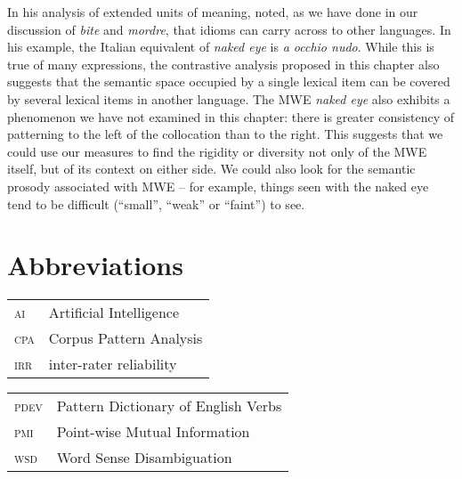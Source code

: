 \documentclass[output=paper]{langsci/langscibook}
\begin{document}
\largerpage
In his analysis of extended units of meaning, \cite{Sinclair:1991}  noted, as
we have done in our discussion of \textit{bite} and \textit{mordre}, that idioms can
carry across to other languages. In his example, the Italian equivalent
of \textit{naked eye} is \textit{a occhio nudo}. While this is true of many
expressions, the contrastive analysis proposed in this chapter also
suggests that the semantic space occupied by a single lexical item can
be covered by several lexical items in another language. The MWE \textit{naked eye} also exhibits a phenomenon we have not examined in this chapter:
there is greater consistency of patterning to the left of the
collocation than to the right. This suggests that we could use our
measures to find the rigidity or diversity not only of the MWE itself,
but of its context on either side. We could also look for the semantic
prosody associated with MWE – for example, things seen with the naked
eye tend to be difficult (“small”, “weak” or “faint”) to see. 


\section*{Abbreviations}
 
\begin{tabular}{ll}
\textsc{ai} & Artificial Intelligence  \\
\textsc{cpa} & Corpus Pattern Analysis  \\
\textsc{irr} & inter-rater reliability \\
\end{tabular}
\begin{tabular}{ll}
\textsc{pdev} &  Pattern Dictionary of English Verbs  \\
\textsc{pmi} &  Point-wise Mutual Information \\
\textsc{wsd} & Word Sense Disambiguation  \\
\end{tabular} 



\sloppy
\printbibliography[heading=subbibliography,notkeyword=this]
\end{document}
